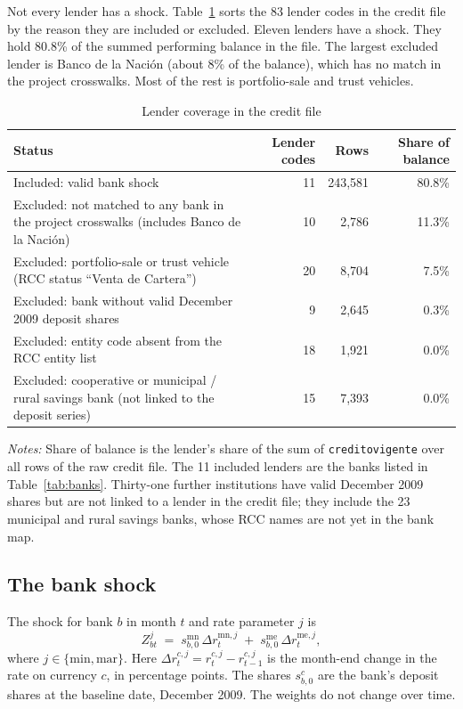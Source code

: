 \documentclass[11pt]{article}
\newcommand{\code}[1]{\texttt{#1}}
\renewcommand{\_}{\origunderscore\hspace{0pt}}  %
\newcommand{\MN}{\mathrm{mn}}
\newcommand{\ME}{\mathrm{me}}
\begin{document}
Not every lender has a shock.
Table~\ref{tab:coverage} sorts the 83 lender codes in the credit file by the reason they are included or excluded.
Eleven lenders have a shock.
They hold 80.8\% of the summed performing balance in the file.
The largest excluded lender is Banco de la Naci\'on (about 8\% of the balance), which has no match in the project crosswalks.
Most of the rest is portfolio-sale and trust vehicles.

\begin{table}[!h]
\centering
\small
\caption{Lender coverage in the credit file}
\label{tab:coverage}
\begin{tabularx}{\textwidth}{@{}Xrrr@{}}
\toprule
Status & Lender codes & Rows & Share of balance \\
\midrule
Included: valid bank shock & 11 & 243,581 & 80.8\% \\
Excluded: not matched to any bank in the project crosswalks (includes Banco de la Naci\'on) & 10 & 2,786 & 11.3\% \\
Excluded: portfolio-sale or trust vehicle (RCC status ``Venta de Cartera'') & 20 & 8,704 & 7.5\% \\
Excluded: bank without valid December 2009 deposit shares & 9 & 2,645 & 0.3\% \\
Excluded: entity code absent from the RCC entity list & 18 & 1,921 & 0.0\% \\
Excluded: cooperative or municipal / rural savings bank (not linked to the deposit series) & 15 & 7,393 & 0.0\% \\
\bottomrule
\end{tabularx}
\par\smallskip
\begin{minipage}{0.95\textwidth}\footnotesize
\textit{Notes:} Share of balance is the lender's share of the sum of \code{credito\_vigente} over all rows of the raw credit file. The 11 included lenders are the banks listed in Table~\ref{tab:banks}. Thirty-one further institutions have valid December 2009 shares but are not linked to a lender in the credit file; they include the 23 municipal and rural savings banks, whose RCC names are not yet in the bank map.
\end{minipage}
\end{table}

\subsection{The bank shock}

The shock for bank $b$ in month $t$ and rate parameter $j$ is
\begin{equation}
Z^{j}_{bt} \;=\; s^{\MN}_{b,0}\,\Delta r^{\MN,j}_{t} \;+\; s^{\ME}_{b,0}\,\Delta r^{\ME,j}_{t},
\label{eq:shock}
\end{equation}
where $j\in\{\text{min},\text{mar}\}$.
Here $\Delta r^{c,j}_t = r^{c,j}_t - r^{c,j}_{t-1}$ is the month-end change in the rate on currency $c$, in percentage points.
The shares $s^{c}_{b,0}$ are the bank's deposit shares at the baseline date, December 2009.
The weights do not change over time.
\end{document}
